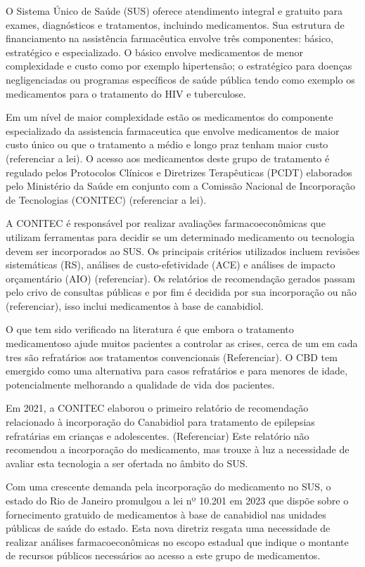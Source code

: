 \documentclass[article,a4paper,12pt,brazil,sumario=tradicional]{abntex2}
\begin{document}
O Sistema Único de Saúde (SUS) oferece atendimento integral e gratuito para exames, diagnósticos e tratamentos, incluindo medicamentos. Sua estrutura de financiamento na assistência farmacêutica envolve três componentes: básico, estratégico e especializado. O básico envolve medicamentos de menor complexidade e custo como por exemplo hipertensão; o estratégico para doenças negligenciadas ou programas específicos de saúde pública tendo como exemplo os medicamentos para o tratamento do HIV e tuberculose.

Em um nível de maior complexidade estão os medicamentos do componente especializado da assistencia farmaceutica que envolve medicamentos de maior custo único ou que o tratamento a médio e longo praz tenham maior custo (referenciar a lei). O acesso aos medicamentos deste grupo de tratamento é regulado pelos Protocolos Clínicos e Diretrizes Terapêuticas (PCDT) elaborados pelo Ministério da Saúde em conjunto com a Comissão Nacional de Incorporação de Tecnologias (CONITEC) (referenciar a lei). 

A CONITEC é responsável por realizar avaliações farmacoeconômicas que utilizam ferramentas para decidir se um determinado medicamento ou tecnologia devem ser incorporados ao SUS. Os principais critérios utilizados incluem revisões sistemáticas (RS), análises de custo-efetividade (ACE) e análises de impacto orçamentário (AIO) (referenciar). Os relatórios de recomendação gerados passam pelo crivo de consultas públicas e por fim é decidida por sua incorporação ou não (referenciar), isso inclui medicamentos à base de canabidiol.

O que tem sido verificado na literatura é que embora o tratamento medicamentoso ajude muitos pacientes a controlar as crises, cerca de um em cada tres são refratários aos tratamentos convencionais (Referenciar). O CBD tem emergido como uma alternativa para casos refratários e para menores de idade, potencialmente melhorando a qualidade de vida dos pacientes.

Em 2021, a CONITEC elaborou o primeiro relatório de recomendação relacionado à incorporação do Canabidiol para tratamento de epilepsias refratárias em crianças e adolescentes. (Referenciar) Este relatório não recomendou a incorporação do medicamento, mas trouxe à luz a necessidade de avaliar esta tecnologia a ser ofertada no âmbito do SUS.

Com uma crescente demanda pela incorporação do medicamento no SUS, o estado do Rio de Janeiro promulgou a lei nº 10.201 em 2023 que dispõe sobre o fornecimento gratuido de medicamentos à base de canabidiol nas unidades públicas de saúde do estado. Esta nova diretriz resgata uma necessidade de realizar análises farmacoeconômicas no escopo estadual que indique o montante de recursos públicos necessários ao acesso a este grupo de medicamentos.
\end{document}
